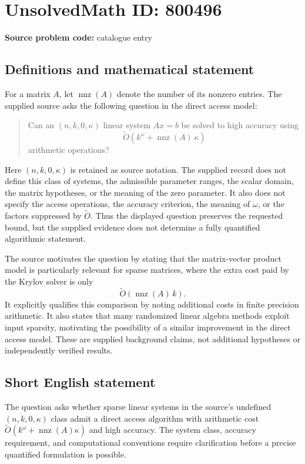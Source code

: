 \documentclass[11pt]{article}
\begin{document}
\section*{UnsolvedMath ID: 800496}
\textbf{Source problem code:} catalogue entry
\subsection{Definitions and mathematical statement}
For a matrix \(A\), let \(\operatorname{nnz}(A)\) denote the number of its nonzero entries. The supplied source asks the following question in the direct access model:
\begin{quote}
Can an \((n,k,0,\kappa)\) linear system \(Ax=b\) be solved to high accuracy using
\[
\widetilde O\!\left(k^\omega+\operatorname{nnz}(A)\,\kappa\right)
\]
arithmetic operations?
\end{quote}
Here \((n,k,0,\kappa)\) is retained as source notation. The supplied record does not define this class of systems, the admissible parameter ranges, the scalar domain, the matrix hypotheses, or the meaning of the zero parameter. It also does not specify the access operations, the accuracy criterion, the meaning of \(\omega\), or the factors suppressed by \(\widetilde O\). Thus the displayed question preserves the requested bound, but the supplied evidence does not determine a fully quantified algorithmic statement.

The source motivates the question by stating that the matrix-vector product model is particularly relevant for sparse matrices, where the extra cost paid by the Krylov solver is only
\[
\widetilde O\!\left(\operatorname{nnz}(A)\,k\right).
\]
It explicitly qualifies this comparison by noting additional costs in finite precision arithmetic. It also states that many randomized linear algebra methods exploit input sparsity, motivating the possibility of a similar improvement in the direct access model. These are supplied background claims, not additional hypotheses or independently verified results.
\subsection{Short English statement}
The question asks whether sparse linear systems in the source's undefined \((n,k,0,\kappa)\) class admit a direct access algorithm with arithmetic cost \(\widetilde O(k^\omega+\operatorname{nnz}(A)\kappa)\) and high accuracy. The system class, accuracy requirement, and computational conventions require clarification before a precise quantified formulation is possible.
\end{document}
